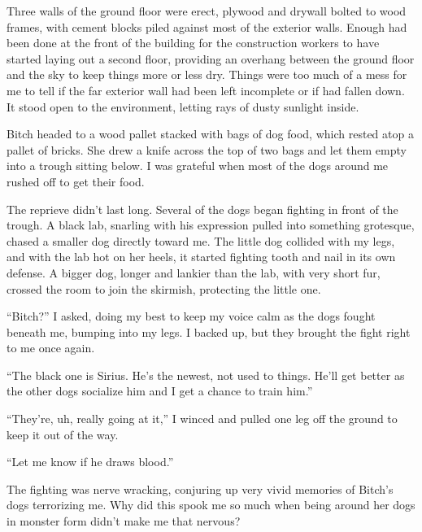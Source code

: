 Three walls of the ground floor were erect, plywood and drywall bolted to wood frames, with cement blocks piled against most of the exterior walls.  Enough had been done at the front of the building for the construction workers to have started laying out a second floor, providing an overhang between the ground floor and the sky to keep things more or less dry.   Things were too much of a mess for me to tell if the far exterior wall had been left incomplete or if had fallen down.  It stood open to the environment, letting rays of dusty sunlight inside.



Bitch headed to a wood pallet stacked with bags of dog food, which rested atop a pallet of bricks.  She drew a knife across the top of two bags and let them empty into a trough sitting below.  I was grateful when most of the dogs around me rushed off to get their food.



The reprieve didn't last long.  Several of the dogs began fighting in front of the trough.  A black lab, snarling with his expression pulled into something grotesque, chased a smaller dog directly toward me.  The little dog collided with my legs, and with the lab hot on her heels, it started fighting tooth and nail in its own defense.  A bigger dog, longer and lankier than the lab, with very short fur, crossed the room to join the skirmish, protecting the little one.



``Bitch?''  I asked, doing my best to keep my voice calm as the dogs fought beneath me, bumping into my legs.  I backed up, but they brought the fight right to me once again.



``The black one is Sirius.  He's the newest, not used to things.  He'll get better as the other dogs socialize him and I get a chance to train him.''



``They're, uh, really going at it,'' I winced and pulled one leg off the ground to keep it out of the way.



``Let me know if he draws blood.''



The fighting was nerve wracking, conjuring up very vivid memories of Bitch's dogs terrorizing me.  Why did this spook me so much when being around her dogs in monster form didn't make me that nervous?



